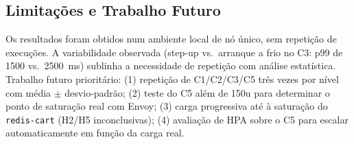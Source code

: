 \documentclass[acmsmall,screen=true,nonacm]{acmart}
\begin{document}
\subsection{Limitações e Trabalho Futuro}

Os resultados foram obtidos num ambiente local de nó único, sem repetição de execuções. A variabilidade observada (step-up vs.\ arranque a frio no C3: p99 de 1500 vs.\ 2500~ms) sublinha a necessidade de repetição com análise estatística. Trabalho futuro prioritário: (1) repetição de C1/C2/C3/C5 três vezes por nível com média $\pm$ desvio-padrão; (2) teste do C5 além de 150u para determinar o ponto de saturação real com Envoy; (3) carga progressiva até à saturação do \texttt{redis-cart} (H2/H5 inconclusivas); (4) avaliação de HPA sobre o C5 para escalar automaticamente em função da carga real.
\end{document}
